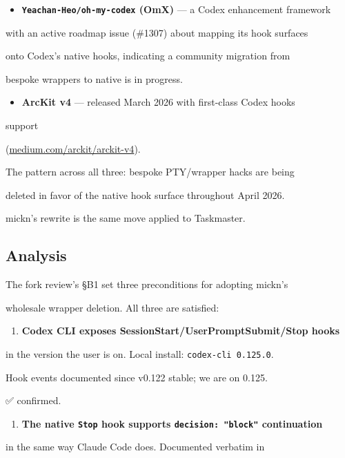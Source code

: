 \documentclass[twocolumn,10pt,letterpaper]{article}
\begin{document}
\begin{itemize}
\setlength{\itemsep}{0pt}
\setlength{\parskip}{0pt}
  \item \textbf{\texttt{Yeachan-\allowbreak Heo/\allowbreak oh-\allowbreak my-\allowbreak codex} (OmX)} — a Codex enhancement framework
\end{itemize}
  with an active roadmap issue (\#1307) about mapping its hook surfaces

  onto Codex's native hooks, indicating a community migration from

  bespoke wrappers to native is in progress.

\begin{itemize}
\setlength{\itemsep}{0pt}
\setlength{\parskip}{0pt}
  \item \textbf{ArcKit v4} — released March 2026 with first-class Codex hooks
\end{itemize}
  support

  (\href{https://medium.com/arckit/arckit-v4-first-class-codex-and-gemini-support-with-hooks-mcp-servers-and-native-policies-abdf9569e00e}{medium.com/arckit/arckit-v4}).


The pattern across all three: bespoke PTY/wrapper hacks are being

deleted in favor of the native hook surface throughout April 2026.

mickn's rewrite is the same move applied to Taskmaster.


\subsection{Analysis}

The fork review's §B1 set three preconditions for adopting mickn's

wholesale wrapper deletion. All three are satisfied:


\begin{enumerate}
\setlength{\itemsep}{0pt}
\setlength{\parskip}{0pt}
  \item \textbf{Codex CLI exposes SessionStart/UserPromptSubmit/Stop hooks}
\end{enumerate}
   in the version the user is on. Local install: \texttt{codex-\allowbreak cli 0.125.0}.

   Hook events documented since v0.122 stable; we are on 0.125.

   ✅ confirmed.


\begin{enumerate}
\setlength{\itemsep}{0pt}
\setlength{\parskip}{0pt}
  \item \textbf{The native \texttt{Stop} hook supports \texttt{decision: "block"} continuation}
\end{enumerate}
   in the same way Claude Code does. Documented verbatim in
\end{document}
